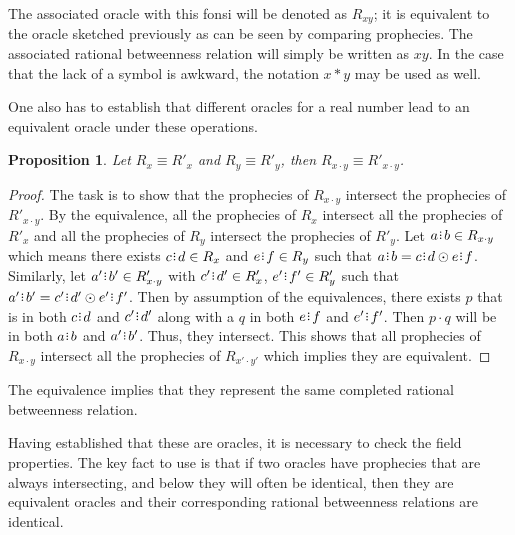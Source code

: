\documentclass[12pt]{article}
\newtheorem{proposition}{Proposition}[section]
\begin{document}
The associated oracle with this fonsi will be denoted as $R_{xy}$; it is equivalent to the oracle sketched previously as can be seen by comparing prophecies. The associated rational betweenness relation will simply be written as $xy$. In the case that the lack of a symbol is awkward, the notation $x * y$ may be used as well. 

One also has to establish that different oracles for a real number lead to an equivalent oracle under these operations. 

\begin{proposition}
    Let $R_x \equiv R'_x$ and $R_y \equiv R'_y$, then $R_{x \cdot y} \equiv R'_{x \cdot y}$.
\end{proposition}

\begin{proof}
The task is to show that the prophecies of $R_{x \cdot y}$ intersect the prophecies of $R'_{x \cdot y}$. By the equivalence, all the prophecies of $R_x$ intersect all the prophecies of $R'_x$ and all the prophecies of $R_y$ intersect the prophecies of $R'_y$. Let $a\rint b \in R_{x \cdot y}$ which means there exists $c\rint d \in R_x$ and $e\rint f \in R_y$ such that $a\rint b = c\rint d \odot e\rint f$. Similarly, let $a'\rint b'\in R'_{x \cdot y}$ with $c'\rint d' \in R'_x$, $e'\rint f' \in R'_y$ such that $a'\rint b' = c'\rint d' \odot e'\rint f'$. Then by assumption of the equivalences, there exists $p$ that is in both $c\rint d$ and $c'\rint d'$ along with a $q$ in both $e\rint f$ and $e'\rint f'$. Then $p \cdot q$ will be in both $a\rint b$ and $a'\rint b'$. Thus, they intersect. This shows that all prophecies of $R_{x \cdot y}$ intersect all the prophecies of $R_{x' \cdot y'}$ which implies they are equivalent. 
\end{proof}

The equivalence implies that they represent the same completed rational betweenness relation.

Having established that these are oracles, it is necessary to check the field properties. The key fact to use is that if two oracles have prophecies that are always intersecting, and below they will often be identical, then they are equivalent oracles and their corresponding rational betweenness relations are identical. 
\end{document}
